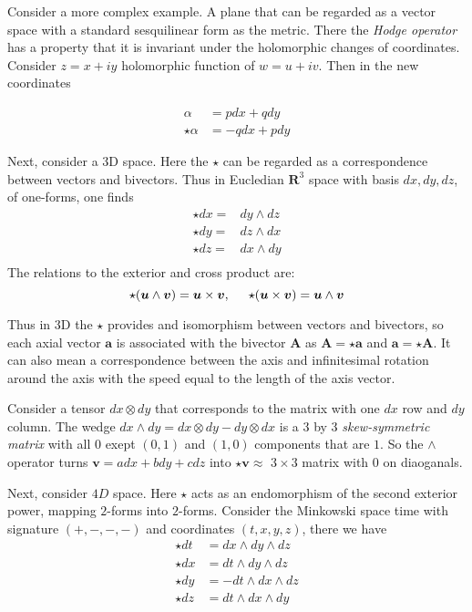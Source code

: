 {    Consider a more complex example. A plane that can be regarded as a vector space with a standard sesquilinear form as the metric. 
    There the \textit{Hodge operator} has a property that it is invariant under the holomorphic changes of coordinates. 
    Consider $z = x + iy$ holomorphic function of $w=u + iv$. Then in the new coordinates 
    
    \begin{align}
    \alpha &= pdx +qdy \\
    \star \alpha &= -q dx + p dy
    \end{align}
    
    Next, consider a 3D space. 
    Here the $\star$ can be regarded as a correspondence between vectors and bivectors. 
    Thus in Eucledian $\boldsymbol{R}^3$ space with basis $dx,dy,dz$, of one-forms, one finds
    \begin{align}
    \star dx =& dy\wedge dz \\
    \star dy =& dz\wedge dx \\
    \star dz =& dx \wedge dy \\
    \end{align}
    The relations to the exterior and cross product are:
    \begin{equation}
    \star(\boldsymbol{u}\wedge\boldsymbol{v})=\boldsymbol{u}\times\boldsymbol{v}, \hspace{5mm}\star(\boldsymbol{u}\times\boldsymbol{v}) = \boldsymbol{u}\wedge\boldsymbol{v}
    \end{equation}
    
    Thus in 3D the $\star$ provides and isomorphism between vectors and bivectors, so each axial vector $\boldsymbol{a}$ is associated with the bivector $\boldsymbol{A}$ as $\boldsymbol{A} = \star\boldsymbol{a}$ and $\boldsymbol{a} = \star\boldsymbol{A}$. It can also mean a correspondence between the axis and infinitesimal rotation around the axis with the speed equal to the length of the axis vector.
    
    Consider a tensor $dx \otimes dy$ that corresponds to the matrix with one $dx$ row and $dy$ column. The wedge $dx\wedge dy = dx\otimes dy - dy\otimes dx$ is a 3 by 3 \textit{skew-symmetric matrix} with all $0$ exept $(0,1)$ and $(1,0)$ components that are $1$. 
    So the $\wedge$ operator turns $\boldsymbol{v} = adx + bdy + cdz$ into $\star\boldsymbol{v}\approx$ $3\times 3$ matrix with $0$ on diaoganals.
    
    Next, consider $4D$ space.
    Here $\star$ acts as an endomorphism of the second exterior power, mapping $2$-forms into $2$-forms. 
    Consider the Minkowski space time with signature $(+,-,-,-)$ and coordinates $(t,x,y,z)$, there we have
    \begin{align}
    \star dt &= dx \wedge dy \wedge dz \\
    \star dx &= dt \wedge dy \wedge dz \\
    \star dy &= -dt \wedge dx \wedge dz \\ 
    \star dz &= dt \wedge dx \wedge dy 
    \end{align}
    
}
